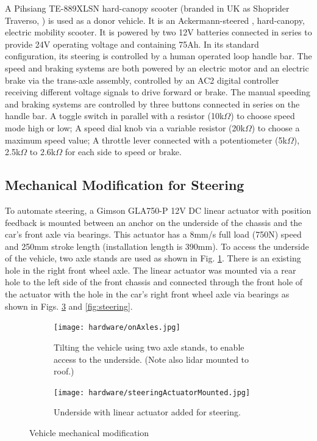 \documentclass[a4paper]{article}
\begin{document}
	A Pihsiang TE-889XLSN hard-canopy scooter (branded in UK as Shoprider Traverso, \cite{shoprider2016shoprider}) is used as a donor vehicle. It is an Ackermann-steered \cite{milliken1995race}, hard-canopy, electric mobility scooter. It is powered by two 12V batteries connected in series to provide 24V operating voltage and containing 75Ah. In its standard configuration, its steering is controlled by a human operated loop handle bar. The speed and braking systems are both powered by an electric motor and an electric brake via the trans-axle assembly, controlled by an AC2 digital controller receiving different voltage signals to drive forward or brake. The manual speeding and braking systems are controlled by three buttons connected in series on the handle bar. A toggle switch in parallel with a resistor (10k$\Omega$) to choose speed mode high or low; A speed dial knob via a variable resistor (20k$\Omega$) to choose a maximum speed value; A throttle lever connected with a potentiometer (5k$\Omega$), 2.5k$\Omega$ to 2.6k$\Omega$ for each side to speed or brake. 
	
	\subsection{Mechanical Modification for Steering}
	
	To automate steering, a Gimson GLA750-P 12V DC linear actuator with position feedback is mounted between an anchor on the underside of the chassis and the car's front axle via bearings.  This actuator has a 8mm/s full load (750N) speed and 250mm stroke length (installation length is 390mm). To access the underside of the vehicle, two axle stands are used as shown in Fig. \ref{fig:axelStands}. There is an existing hole in the right front wheel axle. The linear actuator was mounted via a rear hole to the left side of the front chassis and connected through the front hole of the actuator with the hole in the car's right front wheel axle via bearings as shown in Figs. \ref{fig:actuatorMounted} and \ref{fig:steering}.
	
	
	\begin{figure}
		\centering
		\begin{subfigure}{0.45\textwidth}
			\centering
			\texttt{[image: hardware/onAxles.jpg]}
			\caption{Tilting the vehicle using two axle stands, to enable access to the underside. (Note also lidar mounted to roof.)}
			\label{fig:axelStands}
		\end{subfigure}	
		\quad
		\begin{subfigure}{0.45\textwidth}
			\centering
			\texttt{[image: hardware/steeringActuatorMounted.jpg]}
			\caption{Underside with linear actuator added for steering.}
			\label{fig:actuatorMounted}
		\end{subfigure}
		\caption{Vehicle mechanical modification}
	\end{figure}
	
\end{document}
